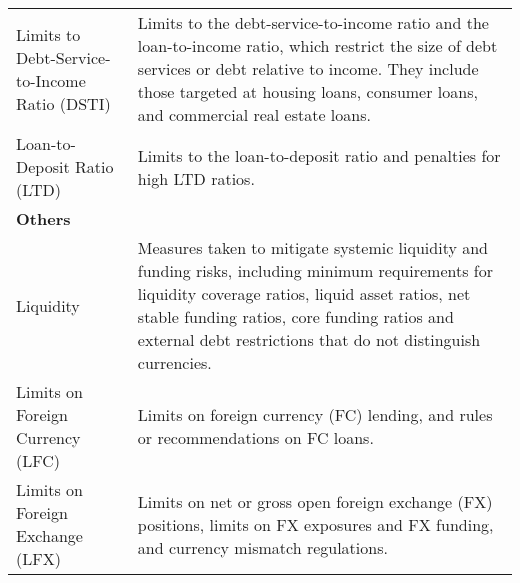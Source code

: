 \begin{table}[p]
{\begin{tabular}{ l  p{10cm}}
Limits to Debt-Service-to-Income Ratio (DSTI)	&	Limits to the debt-service-to-income ratio and the loan-to-income ratio, which restrict the size of debt services or debt relative to income. They include those targeted at housing loans, consumer loans, and commercial real estate loans.	\vspace{0.5em}	\\
Loan-to-Deposit Ratio (LTD)	&	Limits to the loan-to-deposit ratio and penalties for high LTD ratios.		\\
\textbf{Others}	&			\\
Liquidity	&	Measures taken to mitigate systemic liquidity and funding risks, including minimum requirements for liquidity coverage ratios, liquid asset ratios, net stable funding ratios, core funding ratios and external debt restrictions that do not distinguish currencies.	\vspace{0.5em}	\\
Limits on Foreign Currency (LFC)	&	Limits on foreign currency (FC) lending, and rules or recommendations on FC loans.	\vspace{0.5em}	\\
Limits on Foreign Exchange (LFX)	&	Limits on net or gross open foreign exchange (FX) positions, limits on FX exposures and FX funding, and currency mismatch regulations.		\\
\bottomrule				
\end{tabular}%
}				
\end{table}				
